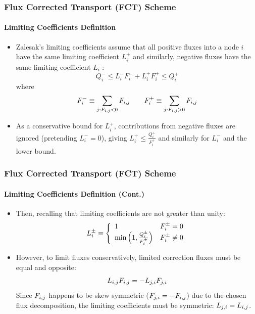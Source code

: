 \documentclass{beamer}
\begin{document}
\begin{frame}
\frametitle{Flux Corrected Transport (FCT) Scheme}
\framesubtitle{Limiting Coefficients Definition}

\begin{itemize}
   \item Zalesak's limiting coefficients assume that
      all positive fluxes into a node $i$ have the same limiting coefficient
      $L^+_i$ and similarly, negative fluxes have the same limiting coefficient
      $L^-_i$:
      \begin{equation}
         Q^-_i \leq L^-_i F^-_i + L^+_i F^+_i \leq Q^+_i
      \end{equation}
      where
      \begin{equation}
         F_i^- \equiv \sum\limits_{j:F_{i,j}<0} F_{i,j} \qquad
         F_i^+ \equiv \sum\limits_{j:F_{i,j}>0} F_{i,j}
      \end{equation}
   \item As a conservative bound for $L^+_i$, contributions from negative fluxes
      are ignored (pretending $L_i^-=0$), giving $L^+_i \leq \frac{Q_i^+}{F_i^+}$
      and similarly for $L^-_i$ and the lower bound.
\end{itemize}

\end{frame}
\begin{frame}
\frametitle{Flux Corrected Transport (FCT) Scheme}
\framesubtitle{Limiting Coefficients Definition (Cont.)}

\begin{itemize}
   \item Then, recalling that limiting coefficients are not greater than unity:
      \begin{equation}
         L_i^\pm \equiv\left\{
            \begin{array}{l l}
               1                                          & F_i^\pm = 0\\
               \min\left(1,\frac{Q_i^\pm}{F_i^\pm}\right) & F_i^\pm \ne 0
            \end{array}
            \right.
      \end{equation}
   \item However, to limit fluxes conservatively, limited correction fluxes must
      be equal and opposite:
      \begin{equation}
         L_{i,j} F_{i,j} = -L_{j,i} F_{j,i}
      \end{equation}
      Since $F_{i,j}$ happens to be skew symmetric ($F_{j,i}=-F_{i,j}$) due to the
      chosen flux decomposition, the limiting coefficients must be symmetric:
      $L_{j,i} = L_{i,j}$.
\end{itemize}

\end{frame}
\end{document}

